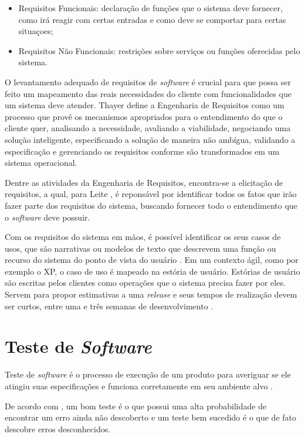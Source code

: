 \begin{itemize}
    \item Requisitos Funcionais: declaração de funções que o sistema deve fornecer, como irá reagir com certas entradas e como deve se comportar para certas situaçoes;
    \item Requisitos Não Funcionais: restrições sobre serviços ou funções oferecidas pelo sistema.
\end{itemize}

O levantamento adequado de requisitos de \textit{software} é crucial para que possa ser feito um mapeamento das reais necessidades do cliente com funcionalidades que um sistema deve atender. Thayer \cite{thayer_1997} define a Engenharia de Requisitos como um processo que provê os mecanismos apropriados para o entendimento do que o cliente quer, analisando a necessidade, avaliando a viabilidade, negociando uma solução inteligente, especificando a solução de maneira não ambígua, validando a especificação e gerenciando os requisitos conforme são transformados em um sistema operacional.

Dentre as atividades da Engenharia de Requisitos, encontra-se a elicitação de requisitos, a qual, para Leite \cite{leite_1994}, é reponsável por identificar todos os fatos que irão fazer parte dos requisitos do sistema, buscando fornecer todo o entendimento que o \textit{software} deve possuir.

Com os requisitos do sistema em mãos, é possível identificar os seus casos de usos, que são narrativas ou modelos de texto que descrevem uma função ou recurso do sistema do ponto de vista do usuário \cite{pressman_2009}. Em um contexto ágil, como por exemplo o XP, o caso de uso é mapeado na estória de usuário. Estórias de usuário são escritas pelos clientes como operações que o sistema precisa fazer por eles. Servem para propor estimativas a uma \textit{release} e seus tempos de realização devem ser curtos, entre uma e três semanas de desenvolvimento \cite{beck_2004}.

\section{Teste de \textit{Software}}
Teste de \textit{software} é o processo de execução de um produto para averiguar se ele atingiu suas especificações e funciona corretamente em seu ambiente alvo \cite{artigo_intro_teste}.

De acordo com , um bom teste é o que possui uma alta probabilidade de encontrar um erro ainda não descoberto e um teste bem sucedido é o que de fato descobre erros desconhecidos.

